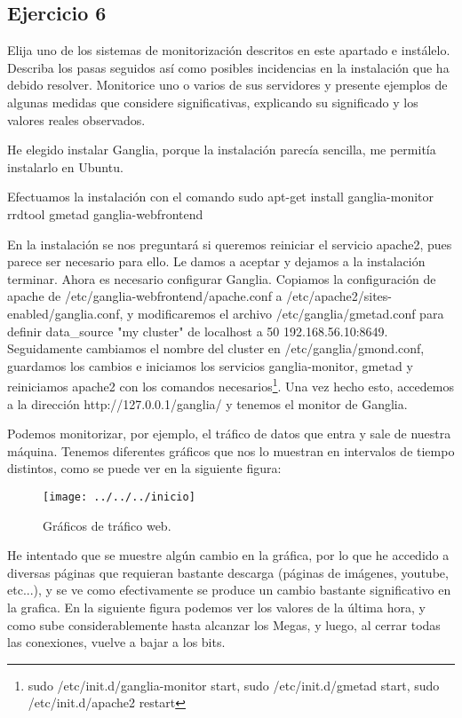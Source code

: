 \documentclass[a4paper, 11pt]{article} %
\begin{document}
\subsection{Ejercicio 6}
Elija uno de los sistemas de monitorización descritos en este apartado e instálelo. Describa los pasas seguidos así como posibles incidencias en la instalación que ha debido resolver. Monitorice uno o varios de sus servidores y presente ejemplos de algunas medidas que considere significativas, explicando su significado y los valores reales observados.

He elegido instalar Ganglia, porque la instalación parecía sencilla, me permitía instalarlo en Ubuntu. 

Efectuamos la instalación con el comando sudo apt-get install ganglia-monitor rrdtool gmetad ganglia-webfrontend

En la instalación se nos preguntará si queremos reiniciar el servicio apache2, pues parece ser necesario para ello. Le damos a aceptar y dejamos a la instalación terminar. Ahora es necesario configurar Ganglia. Copiamos la configuración de apache de  /etc/ganglia-webfrontend/apache.conf a /etc/apache2/sites-enabled/ganglia.conf, y modificaremos el archivo  /etc/ganglia/gmetad.conf para definir data\_source "my cluster" de localhost a 50 192.168.56.10:8649. Seguidamente cambiamos el nombre del cluster en /etc/ganglia/gmond.conf, guardamos los cambios e iniciamos los servicios ganglia-monitor, gmetad y reiniciamos apache2 con los comandos necesarios\footnote{sudo /etc/init.d/ganglia-monitor start, sudo /etc/init.d/gmetad start, sudo /etc/init.d/apache2 restart}. Una vez hecho esto, accedemos a la dirección http://127.0.0.1/ganglia/ y tenemos el monitor de Ganglia. 

Podemos monitorizar, por ejemplo, el tráfico de datos que entra y sale de nuestra máquina. Tenemos diferentes gráficos que nos lo muestran en intervalos de tiempo distintos, como se puede ver en la siguiente figura: 

\begin{figure}[htpb]
\centering
\texttt{[image: ../../../inicio]}
\caption{Gráficos de tráfico web.}
\end{figure}


He intentado que se muestre algún cambio en la gráfica, por lo que he accedido a diversas páginas que requieran bastante descarga (páginas de imágenes, youtube, etc...), y se ve como efectivamente se produce un cambio bastante significativo en la grafica. En la siguiente figura podemos ver los valores de la última hora, y como sube considerablemente hasta alcanzar los Megas, y luego, al cerrar todas las conexiones, vuelve a bajar a los bits. 
\end{document}
